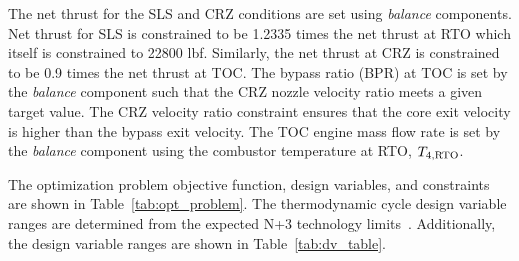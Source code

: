 \documentclass[conf]{new-aiaa}
\begin{document}

The net thrust for the SLS and CRZ conditions are set using \emph{balance} components.
Net thrust for SLS is constrained to be 1.2335 times the net thrust at RTO which itself is constrained to 22800 \si{lbf}.
Similarly, the net thrust at CRZ is constrained to be 0.9 times the net thrust at TOC.
The bypass ratio (BPR) at TOC is set by the \emph{balance} component such that the CRZ nozzle velocity ratio meets a given target value.
The CRZ velocity ratio constraint ensures that the core exit velocity is higher than the bypass exit velocity.
The TOC engine mass flow rate is set by the \emph{balance} component using the combustor temperature at RTO, $T_{4,\rm{RTO}}$.

The optimization problem objective function, design variables, and constraints are shown in Table~\ref{tab:opt_problem}.
The thermodynamic cycle design variable ranges are determined from the expected N+3 technology limits~\cite{Hendricks2019}.
Additionally, the design variable ranges are shown in Table~\ref{tab:dv_table}.
\end{document}
